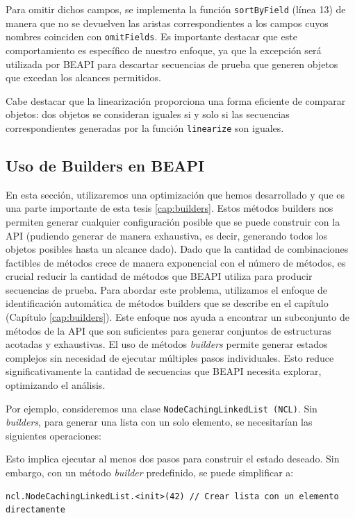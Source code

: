 Para omitir dichos campos, se implementa la función \texttt{sortByField} (línea 13) de manera que no se devuelven las aristas correspondientes a los campos cuyos nombres coinciden con \texttt{omitFields}. Es importante destacar que este comportamiento es específico de nuestro enfoque, ya que la excepción será utilizada por \textsf{BEAPI} para descartar secuencias de prueba que generen objetos que excedan los alcances permitidos.

Cabe destacar que la linearización proporciona una forma eficiente de comparar objetos: dos objetos se consideran iguales si y solo si las secuencias correspondientes generadas por la función \texttt{linearize} son iguales.


\subsection{Uso de Builders en BEAPI}
\label{sec:buildersOptimization}
En esta sección, utilizaremos una optimización que hemos desarrollado y que es una parte importante de esta tesis \ref{cap:builders}. Estos métodos builders nos permiten generar cualquier configuración posible que se puede construir con la API (pudiendo generar de manera exhaustiva, es decir, generando todos los objetos posibles hasta un alcance dado).
Dado que la cantidad de combinaciones factibles de métodos crece de manera exponencial con el número de métodos, es crucial reducir la cantidad de métodos que \textsf{BEAPI} utiliza para producir secuencias de prueba. Para abordar este problema, utilizamos el enfoque de identificación automática de métodos builders que se describe en el capítulo (Capítulo \ref{cap:builders}). Este enfoque nos ayuda a encontrar un subconjunto de métodos de la API que son suficientes para generar conjuntos de estructuras acotadas y exhaustivas. 
El uso de métodos \textit{builders} permite generar estados complejos sin necesidad de ejecutar múltiples pasos individuales. Esto reduce significativamente la cantidad de secuencias que BEAPI necesita explorar, optimizando el análisis. 

Por ejemplo, consideremos una clase \texttt{NodeCachingLinkedList (NCL)}. Sin \textit{builders}, para generar una lista con un solo elemento, se necesitarían las siguientes operaciones:


Esto implica ejecutar al menos dos pasos para construir el estado deseado. Sin embargo, con un método \textit{builder} predefinido, se puede simplificar a:

\begin{lstlisting}
ncl.NodeCachingLinkedList.<init>(42) // Crear lista con un elemento directamente
\end{lstlisting}

